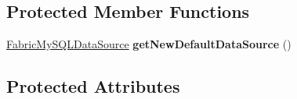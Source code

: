 \subsection*{Protected Member Functions}
\begin{DoxyCompactItemize}
\item 
\mbox{\label{classtestsuite_1_1fabric_1_1_base_fabric_test_case_a24c87d461af0a3ad5b54a20936aacf0b}} 
\mbox{\hyperlink{classcom_1_1mysql_1_1fabric_1_1jdbc_1_1_fabric_my_s_q_l_data_source}{Fabric\+My\+S\+Q\+L\+Data\+Source}} {\bfseries get\+New\+Default\+Data\+Source} ()
\end{DoxyCompactItemize}
\subsection*{Protected Attributes}
